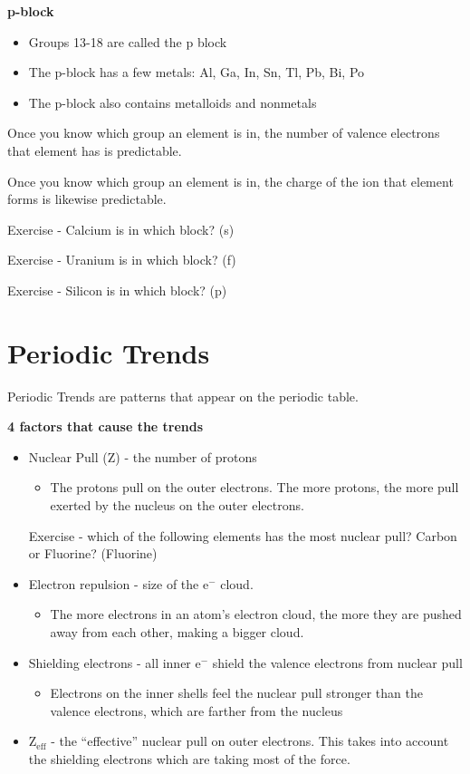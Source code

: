 \documentclass[../hchem.tex]{subfiles}
\begin{document}
\textbf{p-block}
\begin{itemize}
    \item Groups 13-18 are called the p block 
    \item The p-block has a few metals: Al, Ga, In, Sn, Tl, Pb, Bi, Po 
    \item The p-block also contains metalloids and nonmetals 
\end{itemize}

Once you know which group an element is in, the number of valence electrons that element has is predictable.

Once you know which group an element is in, the charge of the ion that element forms is likewise predictable.

Exercise - Calcium is in which block? (s)

Exercise - Uranium is in which block? (f)

Exercise - Silicon is in which block? (p)

\section{Periodic Trends}
Periodic Trends are patterns that appear on the periodic table.

\textbf{4 factors that cause the trends}
\begin{itemize}
    \item Nuclear Pull (Z) - the number of protons 
    \begin{itemize}
        \item The protons pull on the outer electrons. The more protons, the more pull exerted by the nucleus on the outer electrons.
    \end{itemize}

    Exercise - which of the following elements has the most nuclear pull? Carbon or Fluorine? (Fluorine)

    \item Electron repulsion - size of the e$^-$ cloud.
    \begin{itemize}
        \item The more electrons in an atom's electron cloud, the more they are pushed away from each other, making a bigger cloud.
    \end{itemize}

    \item Shielding electrons - all inner e$^-$ shield the valence electrons from nuclear pull 
    \begin{itemize}
        \item Electrons on the inner shells feel the nuclear pull stronger than the valence electrons, which are farther from the nucleus 
    \end{itemize}

    \item Z$_{\text{eff}}$ - the ``effective'' nuclear pull on outer electrons. This takes into account the shielding electrons which are taking most of the force.
\end{itemize}
\end{document}
